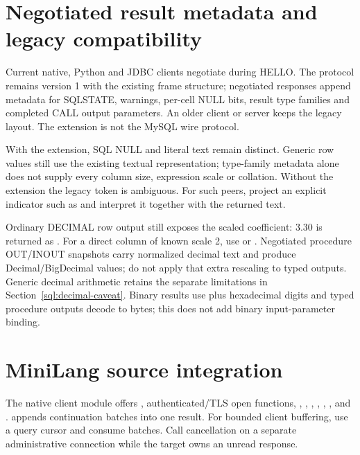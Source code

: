 \section{Negotiated result metadata and legacy compatibility}
\label{adv:wire-null}

Current native, Python and JDBC clients negotiate  during
HELLO. The protocol remains version 1 with the existing frame structure;
negotiated responses append metadata for SQLSTATE, warnings, per-cell NULL
bits, result type families and completed CALL output parameters. An older
client or server keeps the legacy layout. The extension is not the MySQL wire
protocol.

With the extension, SQL NULL and literal text  remain distinct.
Generic row values still use the existing textual representation; type-family
metadata alone does not supply every column size, expression scale or collation.
Without the extension the legacy token  is ambiguous. For such peers,
project an explicit indicator such as
and interpret it together with the returned text.

Ordinary DECIMAL row output still exposes the scaled coefficient:
 3.30 is returned as . For a direct column of known
scale 2, use  or
. Negotiated procedure OUT/INOUT
snapshots carry normalized decimal text and produce Decimal/BigDecimal values;
do not apply that extra rescaling to typed outputs. Generic decimal arithmetic
retains the separate limitations in Section~\ref{sql:decimal-caveat}. Binary
results use  plus hexadecimal digits and typed procedure outputs decode
to bytes; this does not add binary input-parameter binding.


\section{MiniLang source integration}

The native client module offers , authenticated/TLS open functions, , , , , , , and .  appends continuation batches into one result. For bounded client buffering, use a query cursor and consume batches. Call cancellation on a separate administrative connection while the target owns an unread response.

